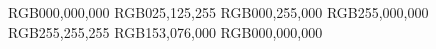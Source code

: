 



\definecolor{lego-black} {RGB}{000,000,000}
\definecolor{lego-blue}  {RGB}{025,125,255}
\definecolor{lego-green} {RGB}{000,255,000}
\definecolor{lego-red}   {RGB}{255,000,000}
\definecolor{lego-white} {RGB}{255,255,255}
\definecolor{lego-brown} {RGB}{153,076,000}
\definecolor{lego-NoCol} {RGB}{000,000,000}
